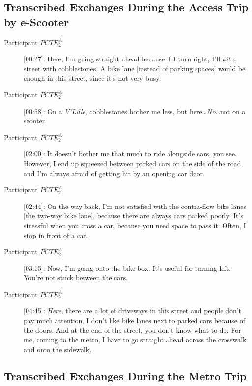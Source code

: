 \subsection{Transcribed Exchanges During the Access Trip by e-Scooter}

\begin{description}
    \item[Participant \(PCTE^{A}_{2}\)] [00:27]: Here, I’m going straight ahead because if I turn right, I’ll \textsl{hit} a street with cobblestones. A bike lane [instead of parking spaces] would be enough in this street, since it’s not very busy.
    \item[Participant \(PCTE^{A}_{2}\)] [00:58]: On a \textsl{V'Lille}, cobblestones bother me less, but here\dots \textsl{No}\dots not on a scooter.
    \item[Participant \(PCTE^{A}_{2}\)] [02:00]: It doesn’t bother me that much to ride alongside cars, you see. However, I end up squeezed between parked cars on the side of the road, and I’m always afraid of getting hit by an opening car door.
    \item[Participant \(PCTE^{A}_{2}\)] [02:44]: On the way back, I’m not satisfied with the contra-flow bike lanes [the two-way bike lane], because there are always cars parked poorly. It’s stressful when you cross a car, because you need space to pass it. Often, I stop in front of a car.
    \item[Participant \(PCTE^{A}_{2}\)] [03:15]: Now, I’m going onto the bike box. It’s useful for turning left. You’re not stuck between the cars.
    \item[Participant \(PCTE^{A}_{2}\)] [04:45]: \textsl{Here}, there are a lot of driveways in this street and people don’t pay much attention. I don’t like bike lanes next to parked cars because of the doors. And at the end of the street, you don’t know what to do. For me, coming to the metro, I have to go straight ahead across the crosswalk and onto the sidewalk.%
\end{description}

\subsection{Transcribed Exchanges During the Metro Trip}

